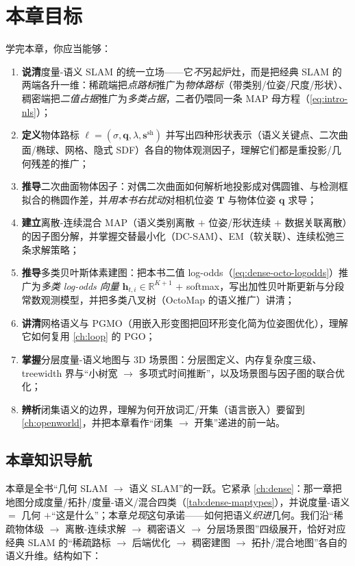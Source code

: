 \section*{本章目标}
学完本章，你应当能够：
\begin{enumerate}
  \item \textbf{说清}度量-语义 SLAM 的统一立场——它\emph{不}另起炉灶，而是把经典 SLAM 的两端各升一维：稀疏端把\emph{点路标}推广为\emph{物体路标}（带类别/位姿/尺度/形状）、稠密端把\emph{二值占据}推广为\emph{多类占据}，二者仍喂同一条 MAP 母方程（\cref{eq:intro-nls}）；
  \item \textbf{定义}物体路标 $\boldsymbol\ell=(\sigma,\mathbf{q},\lambda,\mathbf{s}^{\mathrm{sh}})$ 并写出四种形状表示（语义关键点、二次曲面/椭球、网格、隐式 SDF）各自的物体观测因子，理解它们都是重投影/几何残差的推广；
  \item \textbf{推导}二次曲面物体因子：对偶二次曲面如何解析地投影成对偶圆锥、与检测框拟合的椭圆作差，并\emph{用本书右扰动}对相机位姿 $\mathbf{T}$ 与物体位姿 $\mathbf{q}$ 求导；
  \item \textbf{建立}离散-连续混合 MAP（语义类别离散 $+$ 位姿/形状连续 $+$ 数据关联离散）的因子图分解，并掌握交替最小化（DC-SAM）、EM（软关联）、连续松弛三条求解策略；
  \item \textbf{推导}多类贝叶斯体素建图：把本书二值 log-odds（\cref{eq:dense-octo-logodds}）推广为\emph{多类 log-odds 向量} $\mathbf{h}_{t,i}\in\mathbb{R}^{K+1}$ $+$ softmax，写出加性贝叶斯更新与分段常数观测模型，并把多类八叉树（OctoMap 的语义推广）讲清；
  \item \textbf{讲清}网格语义与 PGMO（用嵌入形变图把回环形变化简为位姿图优化），理解它如何复用 \cref{ch:loop} 的 PGO；
  \item \textbf{掌握}分层度量-语义地图与 3D 场景图：分层图定义、内存复杂度三级、treewidth 界与“小树宽 $\to$ 多项式时间推断”，以及场景图与因子图的联合优化；
  \item \textbf{辨析}闭集语义的边界，理解为何开放词汇/开集（语言嵌入）要留到 \cref{ch:openworld}，并把本章看作“闭集 $\to$ 开集”递进的前一站。
\end{enumerate}

\subsection*{本章知识导航}
本章是全书“几何 SLAM $\to$ 语义 SLAM”的一跃。它紧承 \cref{ch:dense}：那一章把地图分成度量/拓扑/度量-语义/混合四类（\cref{tab:dense-maptypes}），并说度量-语义 $=$ 几何 $+$“这是什么”；本章\emph{兑现}这句承诺——如何把语义\emph{织进}几何。我们沿“稀疏物体级 $\to$ 离散-连续求解 $\to$ 稠密语义 $\to$ 分层场景图”四级展开，恰好对应经典 SLAM 的“稀疏路标 $\to$ 后端优化 $\to$ 稠密建图 $\to$ 拓扑/混合地图”各自的语义升维。结构如下：

